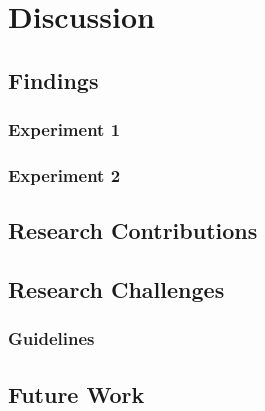 \section{Discussion}
    
\subsection{Findings}
    
\subsubsection{Experiment 1} 
    
\subsubsection{Experiment 2} 

\subsection{Research Contributions}

\subsection{Research Challenges}

\subsubsection{Guidelines}

\subsection{Future Work}
